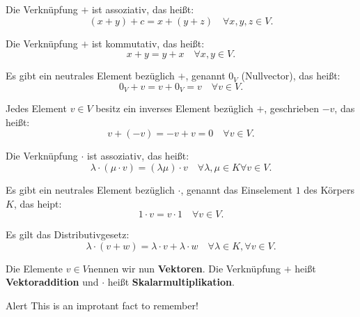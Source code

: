 \begin{tcolorbox}[TUMBox=TUMGreen, title=Definition, breakable]
  \begin{description}[itemsep=0pt]
    \item[(V1)] Die Verknüpfung $+$ ist assoziativ, das heißt:
      \begin{equation}
        (x+y)+c = x+(y+z) \quad\forall x,y,z \in V.
      \end{equation}
    \item[(V2)] Die Verknüpfung $+$ ist kommutativ, das heißt:
      \begin{equation}
        x+y=y+x \quad\forall x,y \in V.
      \end{equation}
    \item[(V3)] Es gibt ein neutrales Element bezüglich $+$, genannt $0_V$
      (Nullvector), das heißt:
      \begin{equation}
        0_V+v=v+0_V=v \quad\forall v \in V.
      \end{equation}
    \item[(V4)] Jedes Element $v \in V$ besitz ein inverses Element bezüglich
      $+$, geschrieben $-v$, das heißt:
      \begin{equation}
        v+(-v)=-v+v=0 \quad\forall v \in V.
      \end{equation}
    \item[(V5)] Die Verknüpfung $\cdot$ ist assoziativ, das heißt:
      \begin{equation}
        \lambda\cdot(\mu\cdot v) = (\lambda\mu)\cdot v \quad\forall\lambda,\mu
        \in K \forall v \in V.
      \end{equation}
    \item[(V6)] Es gibt ein neutrales Element bezüglich $\cdot$, genannt das
      Einselement $1$ des Körpers $K$, das heipt:
      \begin{equation}
        1\cdot v = v\cdot 1 \quad\forall v \in V.
      \end{equation}
    \item[(V7)] Es gilt das Distributivgesetz:
      \begin{equation}
        \lambda\cdot(v+w) = \lambda\cdot v + \lambda\cdot w \quad\forall
        \lambda\in K, \forall v \in V.
      \end{equation}
  \end{description}
  Die Elemente $v \in V$nennen wir nun \textbf{Vektoren}. Die Verknüpfung
  $+$ heißt \textbf{Vektoraddition} und $\cdot$ heißt
  \textbf{Skalarmultiplikation}.
\end{tcolorbox}
\lipsum[5-6]
\begin{TUMBoxFill}[TUMOrange]{Alert}
  This is an improtant fact to remember!
\end{TUMBoxFill}
\lipsum[7]

